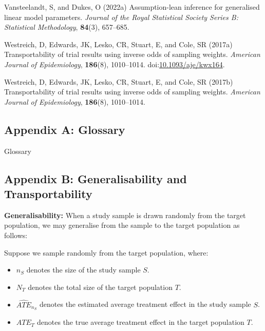 \documentclass[
  single column]{article}
\providecommand{\tightlist}{%
  \setlength{\itemsep}{0pt}\setlength{\parskip}{0pt}}\usepackage{longtable,booktabs,array}
\newlength{\cslhangindent}
\newenvironment{CSLReferences}[2] %
 {\begin{list}{}{%
  \setlength{\itemindent}{0pt}
  \setlength{\leftmargin}{0pt}
  \setlength{\parsep}{0pt}
  \ifodd #1
   \setlength{\leftmargin}{\cslhangindent}
   \setlength{\itemindent}{-1\cslhangindent}
  \fi
  \setlength{\itemsep}{#2\baselineskip}}}
 {\end{list}}
\begin{document}
\begin{CSLReferences}{1}{0}
Vansteelandt, S, and Dukes, O (2022a) Assumption-lean inference for
generalised linear model parameters. \emph{Journal of the Royal
Statistical Society Series B: Statistical Methodology}, \textbf{84}(3),
657--685.

Westreich, D, Edwards, JK, Lesko, CR, Stuart, E, and Cole, SR (2017a)
Transportability of trial results using inverse odds of sampling
weights. \emph{American Journal of Epidemiology}, \textbf{186}(8),
1010--1014.
doi:\href{https://doi.org/10.1093/aje/kwx164}{10.1093/aje/kwx164}.

Westreich, D, Edwards, JK, Lesko, CR, Stuart, E, and Cole, SR (2017b)
Transportability of trial results using inverse odds of sampling
weights. \emph{American Journal of Epidemiology}, \textbf{186}(8),
1010--1014.

\end{CSLReferences}

\newpage{}

\subsection{Appendix A: Glossary}\label{id-app-a}

\begin{table}

\caption{\label{tbl-experiments}Glossary}

\centering{

\glossaryTerms

}

\end{table}%

\newpage{}

\subsection{Appendix B: Generalisability and
Transportability}\label{id-app-b}

\textbf{Generalisability:} When a study sample is drawn randomly from
the target population, we may generalise from the sample to the target
population as follows:

Suppose we sample randomly from the target population, where:

\begin{itemize}
\tightlist
\item
  \(n_S\) denotes the size of the study sample \(S\).
\item
  \(N_T\) denotes the total size of the target population \(T\).
\item
  \(\widehat{ATE}_{n_S}\) denotes the estimated average treatment effect
  in the study sample \(S\).
\item
  \(ATE_{T}\) denotes the true average treatment effect in the target
  population \(T\).
\end{itemize}
\end{document}
